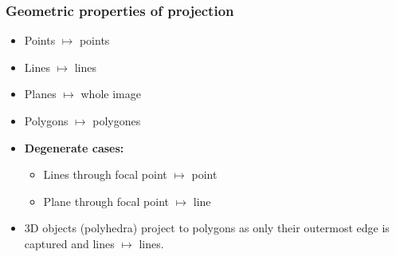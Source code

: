 \documentclass{beamer}
\begin{document}
  \begin{frame}
    \frametitle{Geometric properties of projection}
    \begin{itemize}
      \item Points $\mapsto$ points
      \item Lines $\mapsto$ lines
      \item Planes $\mapsto$ whole image
      \item Polygons    $\mapsto$ polygones
      \item \textbf{Degenerate cases:}
            \begin{itemize}
              \item Lines through focal point $\mapsto$ point
              \item Plane through focal point $\mapsto$ line
            \end{itemize}
      \item 3D objects (polyhedra) project to polygons as only their outermost edge is captured and lines $\mapsto$ lines.
    \end{itemize}
  \end{frame}
\end{document}
